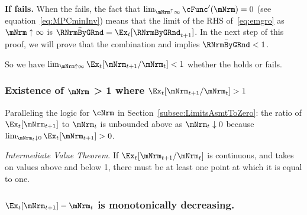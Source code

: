 \documentclass[\econtexRoot/BufferStockTheory]{subfiles}
\begin{document}
\textbf{If {\RIC} fails.}  When the {\RIC} fails, the fact that $\lim_{\mNrm^{\uparrow} \infty} \cFunc^{\prime}(\mNrm) = 0$ (see equation~\eqref{eq:MPCminInv}) means that the limit of the RHS of~\eqref{eq:emgro} as $\mNrm \uparrow \infty$ is $\bar{\RNrmByGRnd}=\Ex_{t}[\RNrmByGRnd_{t+1}]$.  In the next step of this proof, we will prove that the combination {\GICMod} and \cncl{\RIC} implies $\bar{\RNrmByGRnd} < 1$.

So we have $\lim_{\mNrm \uparrow \infty} \Ex_{t}[\mNrm_{t+1}/\mNrm_{t}] < 1$ whether the {\RIC} holds or fails.

\medskip

\subsubsection{Existence of \texorpdfstring{$\mNrm$}{m} > 1 where \texorpdfstring{$\Ex_t [{\mNrm}_{t+1}/\mNrm_t] > 1$}{E[m{t+1}/m{t}] > 1}}
Paralleling the logic for $\cNrm$ in Section~\ref{subsec:LimitsAsmtToZero}: the ratio of $\Ex_{t}[\mNrm_{t+1}]$ to $\mNrm_{t}$ is unbounded above as $\mNrm_{t} \downarrow 0$ because $\lim_{\mNrm_{t}\downarrow 0} \Ex_{t}[\mNrm_{t+1}] > 0$.

\medskip\medskip

\noindent \textit{Intermediate Value Theorem}.  If $\Ex_t [{\mNrm}_{t+1}/\mNrm_t]$ is continuous, and takes on values above and below 1, there must be at least one point at which it is equal to one.

\subsubsection{\texorpdfstring{$\Ex_t [{\mNrm}_{t+1}] -\mNrm_t$}{Delta m} is monotonically decreasing.}
\end{document}
